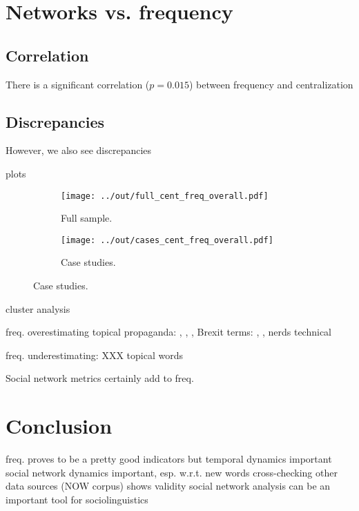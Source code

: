 \documentclass[a4paper, abstract=on]{scrartcl}
\begin{document}
\section{Networks vs. frequency}

  \subsection{Correlation}

    There is a significant correlation ($p = 0.015$) between frequency and centralization

  \subsection{Discrepancies}

    However, we also see discrepancies

      plots

        \begin{figure}
          \centering
          \begin{subfigure}{.45\linewidth}
            \caption{Full sample.}
            \centering
            \texttt{[image: ../out/full\_cent\_freq\_overall.pdf]}
          \end{subfigure}
          \begin{subfigure}{.45\linewidth}
            \caption{Case studies.}
            \centering
            \texttt{[image: ../out/cases\_cent\_freq\_overall.pdf]}
          \end{subfigure}
        \end{figure}

      cluster analysis

        freq. overestimating
          topical
          propaganda: , , , 
          Brexit terms: , , 
          nerds
          technical

        freq. underestimating: XXX
          topical words

    Social network metrics certainly add to freq.

\section{Conclusion}

  freq. proves to be a pretty good indicators
  but
    temporal dynamics important
    social network dynamics important, esp. w.r.t. new words
      cross-checking other data sources (NOW corpus) shows validity
  social network analysis can be an important tool for sociolinguistics


  \printbibliography
\end{document}
